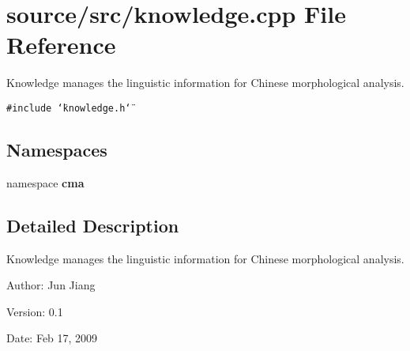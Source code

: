 \section{source/src/knowledge.cpp File Reference}
\label{knowledge_8cpp}
Knowledge manages the linguistic information for Chinese morphological analysis. 

{\tt \#include \char`\"{}knowledge.h\char`\"{}}\par
\subsection*{Namespaces}
\begin{CompactItemize}
\item 
namespace \textbf{cma}
\end{CompactItemize}


\subsection{Detailed Description}
Knowledge manages the linguistic information for Chinese morphological analysis. 

\begin{Desc}
\item[Author:]Jun Jiang \end{Desc}
\begin{Desc}
\item[Version:]0.1 \end{Desc}
\begin{Desc}
\item[Date:]Feb 17, 2009 \end{Desc}
